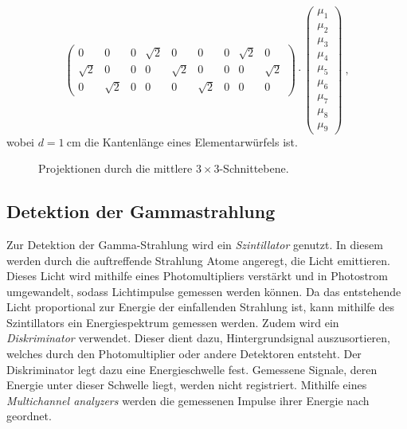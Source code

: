 \begin{equation}
\begin{pmatrix}
            0        & 0        & 0        & \sqrt{2} & 0        & 0        & 0        & \sqrt{2} & 0        \\
            \sqrt{2} & 0        & 0        & 0        & \sqrt{2} & 0        & 0        & 0        & \sqrt{2} \\
            0        & \sqrt{2} & 0        & 0        & 0        & \sqrt{2} & 0        & 0        & 0
        \end{pmatrix}
        \cdot
        \begin{pmatrix}
            \mu_1 \\
            \mu_2 \\
            \mu_3 \\
            \mu_4 \\
            \mu_5 \\
            \mu_6 \\
            \mu_7 \\
            \mu_8 \\
            \mu_9
        \end{pmatrix}
        \ ,
    \end{equation}
    wobei $d = \SI{1}{\centi\meter}$ die Kantenlänge eines Elementarwürfels ist.

    \begin{figure}
        \centering
        \caption{Projektionen durch die mittlere $3\times3$-Schnittebene.}
        \label{fig:theorie:projektionen}
    \end{figure}


\subsection{Detektion der Gammastrahlung}

    Zur Detektion der Gamma-Strahlung wird ein \textit{Szintillator} genutzt.
    In diesem werden durch die auftreffende Strahlung Atome angeregt,
    die Licht emittieren.
    Dieses Licht wird mithilfe eines Photomultipliers verstärkt und in Photostrom umgewandelt,
    sodass Lichtimpulse gemessen werden können.
    Da das entstehende Licht proportional zur Energie der einfallenden Strahlung ist,
    kann mithilfe des Szintillators ein Energiespektrum gemessen werden.
    Zudem wird ein \textit{Diskriminator} verwendet.
    Dieser dient dazu,
    Hintergrundsignal auszusortieren,
    welches durch den Photomultiplier oder andere Detektoren entsteht.
    Der Diskriminator legt dazu eine Energieschwelle fest.
    Gemessene Signale,
    deren Energie unter dieser Schwelle liegt,
    werden nicht registriert.
    Mithilfe eines \textit{Multichannel analyzers} werden die gemessenen Impulse ihrer Energie nach geordnet.
